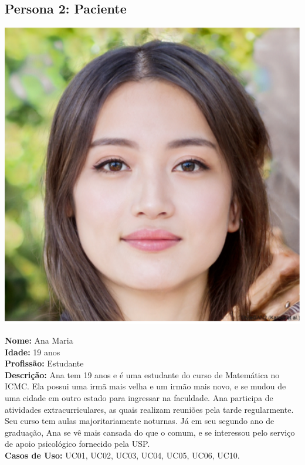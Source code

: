 \documentclass[a4paper,12pt]{report}
\begin{document}
\vspace{1cm} %

\subsection{Persona 2: Paciente}
\begin{minipage}{0.3\textwidth}
    \centering
    \includegraphics[width=1.0\textwidth]{Screenshot from 2024-10-16 15-05-46.png}
\end{minipage}
\hfill
\begin{minipage}{0.65\textwidth}
    \textbf{Nome:} Ana Maria \\
    \textbf{Idade:} 19 anos \\
    \textbf{Profissão:} Estudante \\
    \textbf{Descrição:} Ana tem 19 anos e é uma estudante do curso de Matemática no ICMC. Ela possui uma irmã mais velha e um irmão mais novo, e se mudou de uma cidade em outro estado para ingressar na faculdade. Ana participa de atividades extracurriculares, as quais realizam reuniões pela tarde regularmente. Seu curso tem aulas majoritariamente noturnas. Já em seu segundo ano de graduação, Ana se vê mais cansada do que o comum, e se interessou pelo serviço de apoio psicológico fornecido pela USP.\\
    \textbf{Casos de Uso:} UC01, UC02, UC03, UC04, UC05, UC06, UC10.
\end{minipage}
\end{document}
